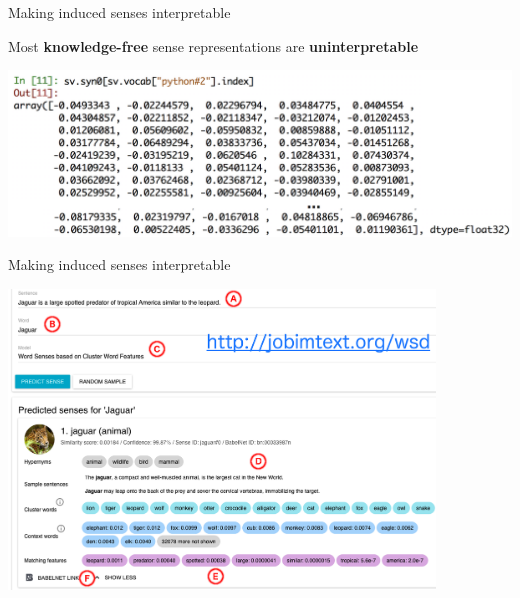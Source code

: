\begin{frame}{ Making induced senses interpretable }

\vspace{-1em}
Most \textbf{knowledge-free} sense representations are 
\alert{\textbf{uninterpretable}}

	\begin{center}
	\includegraphics[width=1.\textwidth]{figures/numpy}
	\end{center}	

\end{frame}


\begin{frame}{ Making induced senses interpretable }

\vspace{-1em}
	\begin{center}
	\includegraphics[width=0.85\textwidth]{figures/emnlp_single}
	\end{center}	
\end{frame}


